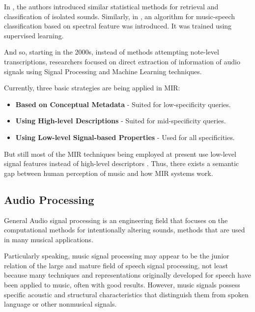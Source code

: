 In \cite{wold1996}, the authors introduced similar statistical methods for retrieval and classification of isolated sounds.
Similarly, in \cite{scheirer1997}, an algorithm for music-speech classification based on spectral feature was introduced. 
It was trained using supervised learning. 

And so, starting in the 2000s, instead of methods attempting note-level transcriptions, researchers focused on direct extraction of information of audio signals using Signal Processing and Machine Learning techniques.

Currently, three basic strategies are being applied in MIR: \cite{Casey2008}

\begin{itemize}
        \item \textbf{Based on Conceptual Metadata} - Suited for low-specificity queries.

        \item \textbf{Using High-level Descriptions} - Suited for mid-specificity queries.

        \item \textbf{Using Low-level Signal-based Properties} - Used for all specificities.

\end{itemize}

But still most of the MIR techniques being employed at present use low-level signal features instead of high-level descriptors \cite{Kaminskas2012}.
Thus, there exists a semantic gap between human perception of music and how MIR systems work.

\subsection{Audio Processing}

General Audio signal processing is an engineering field that focuses on the computational methods for intentionally altering sounds, methods that
are used in many musical applications.

\par Particularly speaking, music signal processing may appear to be the junior relation of the large and mature field of speech signal processing,
not least because many techniques and representations originally developed for speech have been applied to music, often with good results. However,
music signals possess specific acoustic and structural characteristics that distinguish them from spoken language or other nonmusical signals. \cite{muller2011}

